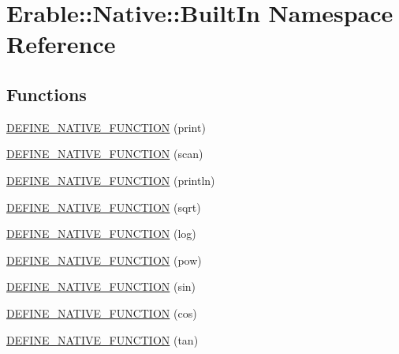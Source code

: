 \hypertarget{namespace_erable_1_1_native_1_1_built_in}{}\section{Erable\+::Native\+::Built\+In Namespace Reference}
\label{namespace_erable_1_1_native_1_1_built_in}
\subsection*{Functions}
\begin{DoxyCompactItemize}
\item 
\mbox{\hyperlink{namespace_erable_1_1_native_1_1_built_in_a3fb490c7e3dcf7f8331deb19746c8e61}{D\+E\+F\+I\+N\+E\+\_\+\+N\+A\+T\+I\+V\+E\+\_\+\+F\+U\+N\+C\+T\+I\+ON}} (print)
\item 
\mbox{\hyperlink{namespace_erable_1_1_native_1_1_built_in_a4ac59d375edc589fe2765fea72a4e857}{D\+E\+F\+I\+N\+E\+\_\+\+N\+A\+T\+I\+V\+E\+\_\+\+F\+U\+N\+C\+T\+I\+ON}} (scan)
\item 
\mbox{\hyperlink{namespace_erable_1_1_native_1_1_built_in_a50bacfddf23840f2f4b9f78244136293}{D\+E\+F\+I\+N\+E\+\_\+\+N\+A\+T\+I\+V\+E\+\_\+\+F\+U\+N\+C\+T\+I\+ON}} (println)
\item 
\mbox{\hyperlink{namespace_erable_1_1_native_1_1_built_in_a0cd338f30dd46e7fa3e0ef68af35d94f}{D\+E\+F\+I\+N\+E\+\_\+\+N\+A\+T\+I\+V\+E\+\_\+\+F\+U\+N\+C\+T\+I\+ON}} (sqrt)
\item 
\mbox{\hyperlink{namespace_erable_1_1_native_1_1_built_in_a090b87b27c2eebc2d369068f3dcb42cf}{D\+E\+F\+I\+N\+E\+\_\+\+N\+A\+T\+I\+V\+E\+\_\+\+F\+U\+N\+C\+T\+I\+ON}} (log)
\item 
\mbox{\hyperlink{namespace_erable_1_1_native_1_1_built_in_a8bfc7131073a243a4306368267916789}{D\+E\+F\+I\+N\+E\+\_\+\+N\+A\+T\+I\+V\+E\+\_\+\+F\+U\+N\+C\+T\+I\+ON}} (pow)
\item 
\mbox{\hyperlink{namespace_erable_1_1_native_1_1_built_in_a864d70808db1bbaba5162edf4bc7e0b4}{D\+E\+F\+I\+N\+E\+\_\+\+N\+A\+T\+I\+V\+E\+\_\+\+F\+U\+N\+C\+T\+I\+ON}} (sin)
\item 
\mbox{\hyperlink{namespace_erable_1_1_native_1_1_built_in_a23fb3adb98034ddc18539b0d3a3d8f0c}{D\+E\+F\+I\+N\+E\+\_\+\+N\+A\+T\+I\+V\+E\+\_\+\+F\+U\+N\+C\+T\+I\+ON}} (cos)
\item 
\mbox{\hyperlink{namespace_erable_1_1_native_1_1_built_in_ac3f961d112cec08601ecf180c069cb37}{D\+E\+F\+I\+N\+E\+\_\+\+N\+A\+T\+I\+V\+E\+\_\+\+F\+U\+N\+C\+T\+I\+ON}} (tan)
\end{DoxyCompactItemize}


